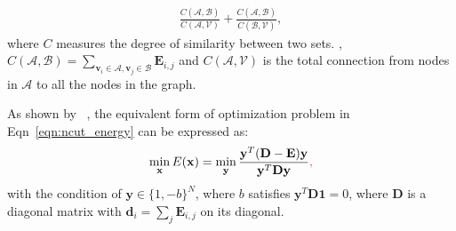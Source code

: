 \documentclass[twocolumn]{article}
\newcommand{\feat}{\mathbf{v}}
\newcommand{\indicator}{\mathbf{x}}
\newcommand{\indicatory}{\mathbf{y}}
\newcommand{\degree}{\mathbf{d}}
\newcommand{\node}{\mathcal{V}}
\newcommand{\Degree}{\mathbf{D}}
\newcommand{\connect}{C}
\newcommand{\lmm}[1]{\textcolor{red}{#1}}
\begin{document}
\begin{align}
    \label{eqn:ncut_energy}
	\frac{ \connect(\mathcal{A}, \mathcal{B})}{\connect(\mathcal{A}, \node)} + \frac{\connect (\mathcal{A}, \mathcal{B})}{\connect(\mathcal{B}, \node)},
\end{align}
where $\connect$ measures the degree of similarity between two sets. , $\connect(\mathcal{A}, \mathcal{B}) = \sum_{\feat_i \in \mathcal{A}, \feat_j \in \mathcal{B}} \mathbf{E}_{i,j}$ and $\connect(\mathcal{A}, \node)$ is the total connection from nodes in $\mathcal{A}$ to all the nodes in the graph. 


As shown by ~\cite{shi2000normalized}, the equivalent form of optimization problem in Eqn~\ref{eqn:ncut_energy} can be expressed as: 
\begin{align}
	\label{eqn:ncut_final}
	\min_{\indicator} E(\indicator) = \min_{\indicatory} \frac{\indicatory^T (\Degree - \mathbf{E}) \indicatory}{\indicatory^T \Degree \indicatory}\lmm{,}
\end{align}
with the condition of $\indicatory \in \{1, -b\}^N$, where $b$ satisfies $\indicatory^T \Degree \mathbf{1} = 0$, where $\Degree$ is a diagonal matrix with $\degree_i = \sum_{j} \mathbf{E}_{i,j}$ on its diagonal. 
\end{document}
